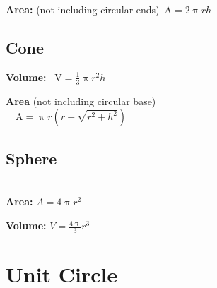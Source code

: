\documentclass[letterpaper,9pt,fleqn]{extarticle}
\begin{document}
\begin{multicols*}{2}
\begin{minipage}[l]{0.25\textwidth}
\noindent \textbf{Area: }  (not including circular ends)\,
\(
   \mbox{A} = 2 \uppi r  h
\)
\end{minipage}
\subsection*{Cone} 
  \begin{minipage}[c]{0.25\textwidth}
  \end{minipage}
  \begin{minipage}[c]{0.25\textwidth}
  \noindent \textbf{Volume:} \,
  \(
     \mbox{V} = \frac{1}{3} \uppi r^2 h
  \)
  
\noindent \textbf{Area} (not including circular base) \, \\
\(
   \quad \mbox{A} =  \uppi r  \left (r + \sqrt{r^2+h^2} \right)
\)
\end{minipage}

\subsection*{Sphere}
\begin{minipage}[c]{0.25\textwidth}
\(\phantom{xxx}\)
\end{minipage}
\begin{minipage}[c]{0.25\textwidth}
\noindent  \textbf{Area:}   \(A = 4 \uppi   r^2 \)

\noindent  \textbf{Volume:}   \(V = \frac{4 \uppi}{3} r^3 \)
\end{minipage}

\vfill

\section*{Unit Circle}


\end{multicols*}
\end{document}
